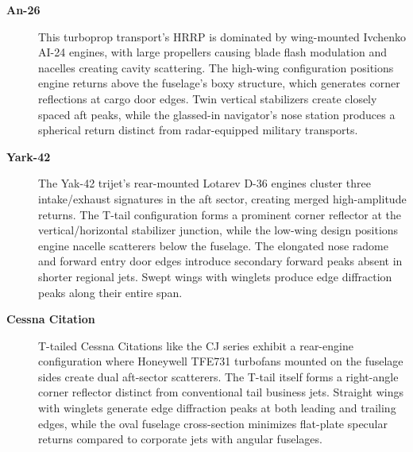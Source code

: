 {\begin{description}
    \item[\textbf{An-26}]
    This turboprop transport’s HRRP is dominated by wing-mounted Ivchenko AI-24 engines, with large propellers causing blade flash modulation and nacelles creating cavity scattering. The high-wing configuration positions engine returns above the fuselage’s boxy structure, which generates corner reflections at cargo door edges. Twin vertical stabilizers create closely spaced aft peaks, while the glassed-in navigator’s nose station produces a spherical return distinct from radar-equipped military transports.

    \item[\textbf{Yark-42}]
    The Yak-42 trijet’s rear-mounted Lotarev D-36 engines cluster three intake/exhaust signatures in the aft sector, creating merged high-amplitude returns. The T-tail configuration forms a prominent corner reflector at the vertical/horizontal stabilizer junction, while the low-wing design positions engine nacelle scatterers below the fuselage. The elongated nose radome and forward entry door edges introduce secondary forward peaks absent in shorter regional jets. Swept wings with winglets produce edge diffraction peaks along their entire span.

    \item[\textbf{Cessna Citation}]
    T-tailed Cessna Citations like the CJ series exhibit a rear-engine configuration where Honeywell TFE731 turbofans mounted on the fuselage sides create dual aft-sector scatterers. The T-tail itself forms a right-angle corner reflector distinct from conventional tail business jets. Straight wings with winglets generate edge diffraction peaks at both leading and trailing edges, while the oval fuselage cross-section minimizes flat-plate specular returns compared to corporate jets with angular fuselages.

\end{description}}

